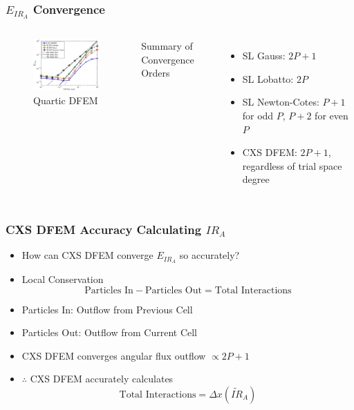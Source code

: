 \documentclass{beamer}
\newcommand{\be}{\begin{equation*}}   %
\newcommand{\ee}{\end{equation*}}
\begin{document}
\begin{frame}
\frametitle{$E_{IR_A}$ Convergence}
\begin{columns}[c]
\begin{figure}
\includegraphics[width = 5cm]{P4_VarXS_E_I_A.eps}
\caption{Quartic DFEM}
\end{figure}
Summary of Convergence Orders
\begin{itemize}
\item SL Gauss: $2P+1$
\item SL Lobatto: $2P$
\item SL Newton-Cotes: $P+1$ for odd $P$, $P+2$ for even $P$
\item CXS DFEM: $2P+1$, regardless of trial space degree
\end{itemize}
\end{columns}
\end{frame}

\begin{frame}
\frametitle{CXS DFEM Accuracy Calculating $IR_A$}
\begin{itemize}
\item How can CXS DFEM converge $E_{IR_A}$ so accurately?
\item Local Conservation
\be
\text{Particles In} - \text{Particles Out} =  \text{Total Interactions} 
\ee
\item Particles In: Outflow from Previous Cell
\item Particles Out: Outflow from Current Cell
\item CXS DFEM converges angular flux outflow $\propto 2P+1$
\item $\therefore$ CXS DFEM accurately calculates
\be
\text{Total Interactions} =\Delta x \left( \widetilde{IR}_A \right)
\ee
\end{itemize}
\end{frame}
\end{document}
